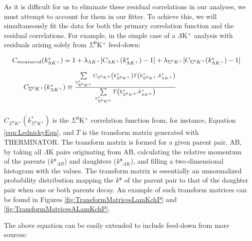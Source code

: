 \documentclass[../AnalysisNoteJBuxton.tex]{subfiles}
\begin{document}
As it is difficult for us to eliminate these residual correlations in our analyses, we must attempt to account for them in our fitter.
To achieve this, we will simultaneously fit the data for both the primary correlation function and the residual correlations.  For example, in the simple case of a $\Lambda$K$^{+}$ analysis with residuals arising solely from $\Sigma^{0}$K$^{+}$ feed-down:

\begin{equation}
\begin{array}{l}
\vspace{4mm}
 C_{measured}(k^{*}_{\Lambda K^{+}}) = 1 + \lambda_{\Lambda K^{+}}[C_{\Lambda K^{+}}(k^{*}_{\Lambda K^{+}})-1] + \lambda_{\Sigma^{0}K^{+}}[C_{\Sigma^{0}K^{+}}(k^{*}_{\Lambda K^{+}})-1] \\
\vspace{2mm}
  ~~~~~C_{\Sigma^{0}K^{+}}(k^{*}_{\Lambda K^{+}}) \equiv \frac{\sum\limits_{k^{*}_{\Sigma^{0}K^{+}}} C_{\Sigma^{0}K^{+}}\left(k^{*}_{\Sigma^{0}K^{+}}\right) T\left(k^{*}_{\Sigma^{0}K^{+}},k^{*}_{\Lambda K^{+}}\right)}{\sum\limits_{k^{*}_{\Sigma^{0}K^{+}}} T\left(k^{*}_{\Sigma^{0}K^{+}},k^{*}_{\Lambda K^{+}}\right)}
\end{array} 
\label{eqn:SimpleResiduals}
\end{equation}

$C_{\Sigma^{0}K^{+}}(k^{*}_{\Sigma^{0}K^{+}})$ is the $\Sigma^{0}$K$^{+}$ correlation function from, for instance, Equation \ref{eqn:LednickyEqn}, and $T$ is the transform matrix generated with THERMINATOR.  The transform matrix is formed for a given parent pair, AB, by taking all $\Lambda$K pairs originating from AB, calculating the relative momentum of the parents (\textit{k}*$_{AB}$) and daughters (\textit{k}*$_{\Lambda K}$), and filling a two-dimensional histogram with the values. The transform matrix is essentially an unnormalized probability distribution mapping the \textit{k}* of the parent pair to that of the daughter pair when one or both parents decay.  An example of such transform matrices can be found in Figures \ref{fig:TransformMatricesLamKchP} and \ref{fig:TransformMatricesALamKchP}.

  The above equation can be easily extended to include feed-down from more sources:
\end{document}
